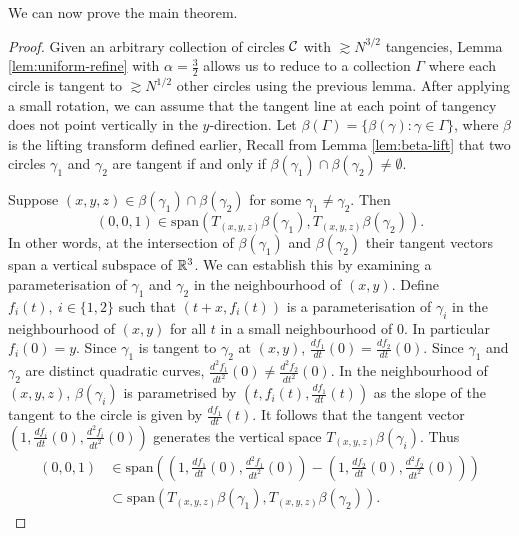 We can now prove the main theorem. 
\begin{proof}
    Given an arbitrary collection of circles $\mathcal C$ with $\gtrsim N^{3/2}$ tangencies, Lemma \ref{lem:uniform-refine} with $\alpha = \frac{3}{2}$ 
    allows us to reduce to a collection
     $\Gamma$ where each circle is tangent to  $\gtrsim N^{1/2}$ other circles using the previous lemma. 
    After applying a small rotation, we can assume that the tangent line at each point of tangency does not point vertically in the $y$-direction.
    Let $\beta (\Gamma) = \{ \beta(\gamma) : \gamma \in \Gamma \}$, where $\beta$ is the lifting transform defined earlier,
    Recall from Lemma \ref{lem:beta-lift} that two circles $\gamma_1$ and $\gamma_2$ are tangent if and only if $\beta(\gamma_1) \cap \beta(\gamma_2) \neq \emptyset$.

    Suppose $(x,y,z) \in \beta(\gamma_1) \cap \beta(\gamma_2) $ for some $\gamma_1 \neq \gamma_2$. 
    Then $$(0,0,1) \in \text{span} \left( T_{(x,y,z) }\beta (\gamma_1), T_{(x,y,z) }\beta (\gamma_2)\right).$$
    In other words, at the intersection of $\beta(\gamma_1)$ and $\beta(\gamma_2)$ their tangent vectors span a vertical subspace of $\mathbb R^3$. 
    We can establish this by examining a parameterisation of $\gamma_1$ and $\gamma_2$ in the neighbourhood of $(x,y)$.
    Define $f_i (t), \ i \in \{1,2\}$ such that $(t+x, f_i(t))$ is a parameterisation of $\gamma_i$ in the neighbourhood of $(x,y)$ for all $t$ in a small neighbourhood of 0. In particular $f_i(0) = y$.
    Since $\gamma_1$ is tangent to $\gamma_2$ at $(x,y)$, $\frac{df_1}{dt}(0) = \frac{df_2}{dt}(0)$. 
    Since $\gamma_1$ and $\gamma_2$ are distinct quadratic curves, $\frac{d^2f_1}{dt^2}(0) \neq \frac{d^2f_2}{dt^2}(0)$. 
    In the neighbourhood of $(x,y,z)$, $\beta(\gamma_i)$ is parametrised by $\left(t,f_i (t) ,\frac{df_1}{dt}(t) \right)$ as the slope of the tangent to the circle is given by $\frac{df_1}{dt}(t)$. 
     It follows that the tangent vector
    $\left(1,\frac{df_i}{dt}(0), \frac{d^2f_i}{dt^2} (0) \right)$ generates the vertical space $T_{(x,y,z)} \beta(\gamma_i)$. Thus 
    \begin{align*} (0,0,1) &\in \text{span}\left( \left(1,\frac{df_1}{dt}(0), \frac{d^2f_1}{dt^2} (0) \right) - \left(1,\frac{df_2}{dt}(0), \frac{d^2f_2}{dt^2} (0) \right) \right)
    \\ &\subset \text{span} \left( T_{(x,y,z) }\beta (\gamma_1), T_{(x,y,z) }\beta (\gamma_2)\right). 
    \end{align*}


\end{proof}
